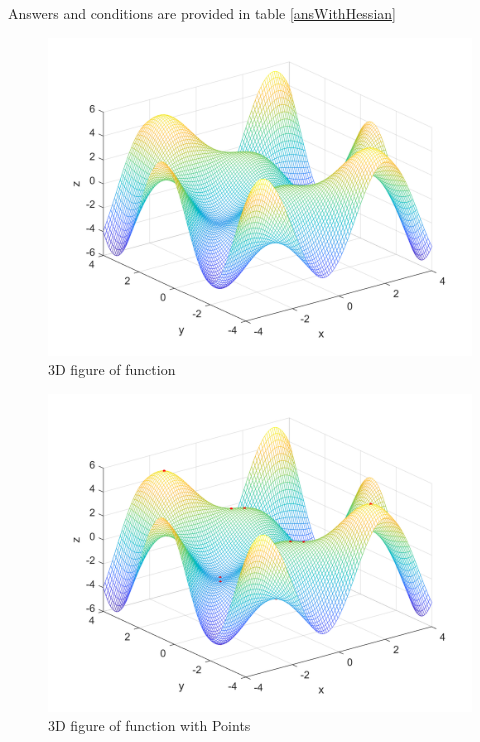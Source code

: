 Answers and conditions are provided in table \ref{ansWithHessian}
\newpage
\begin{figure}[h]
	\caption{3D figure of function}
	\centering
	\includegraphics{Q1/figures/3Dplot.png}
\end{figure}
\newpage
\begin{figure}[h]
	\caption{3D figure of function with Points}
	\centering
	\includegraphics{Q1/figures/3DplotWithPoints.png}
\end{figure}
\newpage
